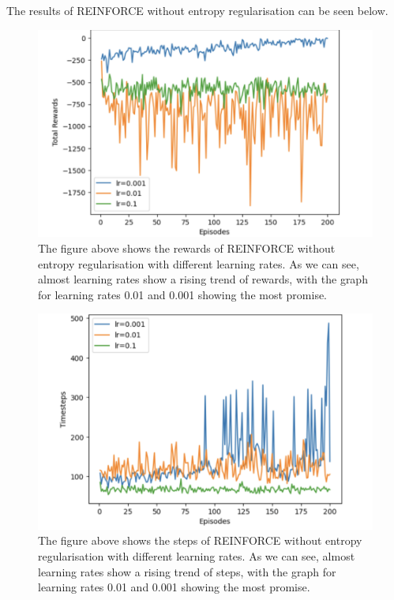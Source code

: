 \documentclass{article}
\begin{document}
The results of REINFORCE without entropy regularisation can be seen below.

\begin{figure}[htbp]
\centering
\includegraphics[width=0.9\linewidth]{Report/images/reinforce_basic_image1.png}
\caption{\label{fig:Reinforce Rewards}The figure above shows the rewards of REINFORCE without entropy regularisation with different learning rates. As we can see, almost learning rates show a rising trend of rewards, with the graph for learning rates 0.01 and 0.001 showing the most promise. }
\end{figure}


\begin{figure}[htbp]
\centering
\includegraphics[width=0.9\linewidth]{Report/images/reinforce_basic_image2.png}
\caption{\label{fig:ReinforceEntropy Rewards}The figure above shows the steps of REINFORCE without entropy regularisation with different learning rates. As we can see, almost learning rates show a rising trend of steps, with the graph for learning rates 0.01 and 0.001 showing the most promise. }
\end{figure}
\end{document}
